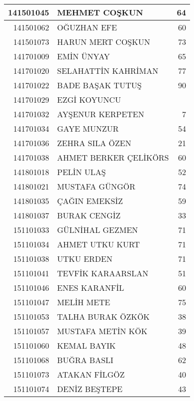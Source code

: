 \documentclass[12pt]{article}
\begin{document}
\begin{multicols}{2}
\begin{longtable}{||r||l||r||}
    \midrule
    141501045 & MEHMET COŞKUN & 64 \\
    \midrule
    141501062 & OĞUZHAN EFE & 60 \\
    \midrule
    141501073 & HARUN MERT COŞKUN & 73 \\
    \midrule
    141701009 & EMİN ÜNYAY & 65 \\
    \midrule
    141701020 & SELAHATTİN KAHRİMAN & \cellcolor[rgb]{ 1,  1,  0} 77 \\
    \midrule
    141701022 & BADE BAŞAK TUTUŞ & 90 \\
    \midrule
    141701029 & EZGİ KOYUNCU &  \\
    \midrule
    141701032 & AYŞENUR KERPETEN & 7 \\
    \midrule
    141701034 & GAYE MUNZUR & 54 \\
    \midrule
    141701036 & ZEHRA SILA ÖZEN & 21 \\
    \midrule
    141701038 & AHMET BERKER ÇELİKÖRS & \cellcolor[rgb]{ 1,  1,  0} 60 \\
    \midrule
    141801018 & PELİN ULAŞ & 52 \\
    \midrule
    141801021 & MUSTAFA GÜNGÖR & 74 \\
    \midrule
    141801035 & ÇAĞIN EMEKSİZ & 59 \\
    \midrule
    141801037 & BURAK CENGİZ & \cellcolor[rgb]{ 1,  1,  0} 33 \\
    \midrule
    151101033 & GÜLNİHAL GEZMEN & 71 \\
    \midrule
    151101034 & AHMET UTKU KURT & 71 \\
    \midrule
    151101038 & UTKU ERDEN & 71 \\
    \midrule
    151101041 & TEVFİK KARAARSLAN & 51 \\
    \midrule
    151101046 & ENES KARANFİL & 60 \\
    \midrule
    151101047 & MELİH METE & 75 \\
    \midrule
    151101053 & TALHA BURAK ÖZKÖK & 38 \\
    \midrule
    151101057 & MUSTAFA METİN KÖK & \cellcolor[rgb]{ 1,  1,  0} 39 \\
    \midrule
    151101060 & KEMAL BAYIK & 48 \\
    \midrule
    151101068 & BUĞRA BASLI & 62 \\
    \midrule
    151101073 & ATAKAN FİLGÖZ & 40 \\
    \midrule
    151101074 & DENİZ BEŞTEPE & 43 \\
    \midrule

\end{longtable}
\end{multicols}
\end{document}
